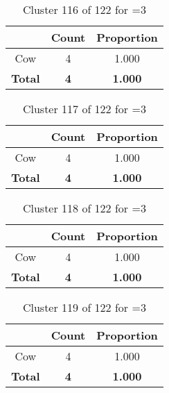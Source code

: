 \begin{table}[ht!]
\centering
\begin{tabular}{|c|c|c|}
\hline
\bf \Spec{} &\bf Count &\bf Proportion\\ \hline \hline
Cow & 4 & 1.000\\ \hline
\hline
\bf Total & \bf 4 & \bf 1.000\\ \hline
\end{tabular}
\label{tab:cluster:116:3}
\caption{Cluster 116 of 122 for \minneigh{}=3}
\end{table}

\begin{table}[ht!]
\centering
\begin{tabular}{|c|c|c|}
\hline
\bf \Spec{} &\bf Count &\bf Proportion\\ \hline \hline
Cow & 4 & 1.000\\ \hline
\hline
\bf Total & \bf 4 & \bf 1.000\\ \hline
\end{tabular}
\label{tab:cluster:117:3}
\caption{Cluster 117 of 122 for \minneigh{}=3}
\end{table}

\begin{table}[ht!]
\centering
\begin{tabular}{|c|c|c|}
\hline
\bf \Spec{} &\bf Count &\bf Proportion\\ \hline \hline
Cow & 4 & 1.000\\ \hline
\hline
\bf Total & \bf 4 & \bf 1.000\\ \hline
\end{tabular}
\label{tab:cluster:118:3}
\caption{Cluster 118 of 122 for \minneigh{}=3}
\end{table}

\begin{table}[ht!]
\centering
\begin{tabular}{|c|c|c|}
\hline
\bf \Spec{} &\bf Count &\bf Proportion\\ \hline \hline
Cow & 4 & 1.000\\ \hline
\hline
\bf Total & \bf 4 & \bf 1.000\\ \hline
\end{tabular}
\label{tab:cluster:119:3}
\caption{Cluster 119 of 122 for \minneigh{}=3}
\end{table}

